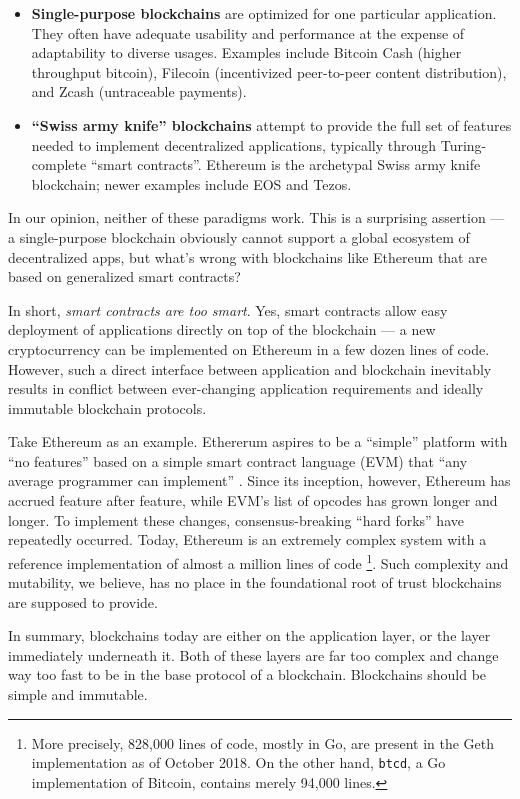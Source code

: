 \documentclass[headinclude]{scrbook}
\begin{document}
\begin{itemize}
    \item \textbf{Single-purpose blockchains} are optimized for one particular application. They often have adequate usability and performance at the expense of adaptability to diverse usages. Examples include Bitcoin Cash (higher throughput bitcoin), Filecoin (incentivized peer-to-peer content distribution), and Zcash (untraceable payments).
    \item \textbf{``Swiss army knife'' blockchains} attempt to provide the full set of features needed to implement decentralized applications, typically through Turing-complete ``smart contracts''. Ethereum is the archetypal Swiss army knife blockchain; newer examples include EOS and Tezos.
\end{itemize}

In our opinion, neither of these paradigms work. This is a surprising assertion --- a single-purpose blockchain obviously cannot support a global ecosystem of decentralized apps, but what's wrong with blockchains like Ethereum that are based on generalized smart contracts?

In short, \textit{smart contracts are too smart}. Yes, smart contracts allow easy deployment of applications directly on top of the blockchain --- a new cryptocurrency can be implemented on Ethereum in a few dozen lines of code. However, such a direct interface between application and blockchain inevitably results in conflict between ever-changing application requirements and ideally immutable blockchain protocols.

Take Ethereum as an example. Ethererum aspires to be a ``simple'' platform with ``no features'' based on a simple smart contract language (EVM)  that ``any average programmer can implement'' \cite{buterin2014ethereum}. Since its inception, however, Ethereum has accrued feature after feature, while EVM's list of opcodes has grown longer and longer. To implement these changes, consensus-breaking ``hard forks'' have repeatedly occurred. Today, Ethereum is an extremely complex system with a reference implementation of almost a million lines of code \footnote{More precisely, 828,000 lines of code, mostly in Go, are present in the Geth implementation as of October 2018. On the other hand, \texttt{btcd}, a Go implementation of Bitcoin, contains merely 94,000 lines.}. Such complexity and mutability, we believe, has no place in the foundational root of trust blockchains are supposed to provide.

In summary, blockchains today are either on the application layer, or the layer immediately underneath it. Both of these layers are far too complex and change way too fast to be in the base protocol of a blockchain. Blockchains should be simple and immutable.
\end{document}
